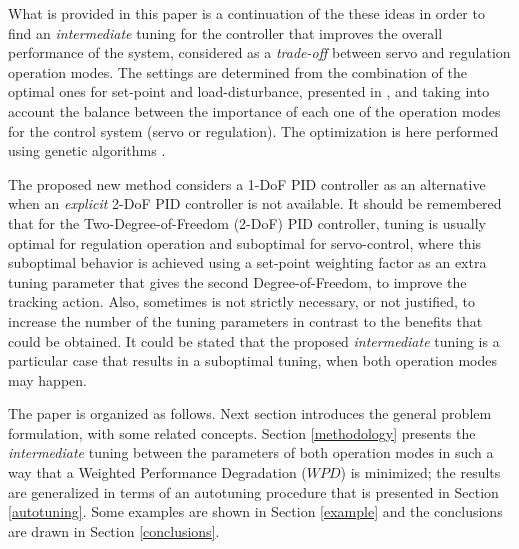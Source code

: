 What is provided in this paper is a continuation of the these
ideas in order to find an \emph{intermediate} tuning for the
controller that improves the overall performance of the system,
considered as a \emph{trade-off} between servo and regulation
operation modes. The settings are determined from the combination
of the optimal ones for set-point and load-disturbance, presented
in \cite{zhuangAthertonIEE1993}, and taking into account the
balance between the importance of each one of the operation modes
for the control system (servo or regulation). The optimization is
here performed using genetic algorithms \citep{mitchell1998}.

The proposed new method considers a 1-DoF PID controller as an
alternative when an \emph{explicit} 2-DoF PID controller is not
available. It should be remembered that for the
Two-Degree-of-Freedom (2-DoF) PID controller, tuning is usually
optimal for regulation operation and suboptimal for servo-control,
where this suboptimal behavior is achieved using a set-point
weighting factor as an extra tuning parameter that gives the
second Degree-of-Freedom, to improve the tracking action. Also,
sometimes is not strictly necessary, or not justified, to increase
the number of the tuning parameters in contrast to the benefits
that could be obtained. It could be stated that the proposed
\emph{intermediate} tuning is a particular case that results in a
suboptimal tuning, when both operation modes may happen.

The paper is organized as follows. Next section introduces the
general problem formulation, with some related concepts. Section
\ref{methodology} presents the \emph{intermediate} tuning between
the parameters of both operation modes in such a way that a
Weighted Performance Degradation ($WPD$) is minimized; the results
are generalized in terms of an autotuning procedure that is
presented in Section \ref{autotuning}. Some examples are shown in
Section \ref{example} and the conclusions are drawn in Section
\ref{conclusions}.
